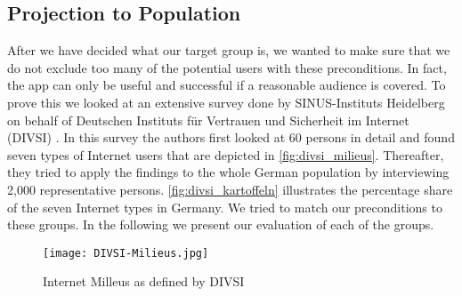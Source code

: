 \subsection{Projection to Population}
After we have decided what our target group is, we wanted to make sure that we do not exclude too many of the potential users with these preconditions.
In fact, the app can only be useful and successful if a reasonable audience is covered.
To prove this we looked at an extensive survey done by SINUS-Instituts Heidelberg on behalf of Deutschen Instituts f\"{u}r Vertrauen und Sicherheit im Internet (DIVSI) \cite{divsi2012divsi}.
In this survey the authors first looked at 60 persons in detail and found seven types of Internet users that are depicted in \autoref{fig:divsi_milieus}.
Thereafter, they tried to apply the findings to the whole German population by interviewing 2,000 representative persons.
\autoref{fig:divsi_kartoffeln} illustrates the percentage share of the seven Internet types in Germany.
We tried to match our preconditions to these groups. In the following we present our evaluation of each of the groups.

\begin{figure}[hHtbp]
\centering
\texttt{[image: DIVSI-Milieus.jpg]}
\caption{Internet Milleus as defined by DIVSI \cite{divsi2012divsi}}
\label{fig:divsi_milieus}
\end{figure}

